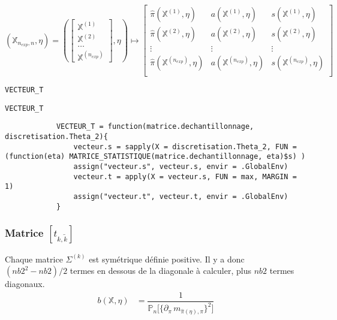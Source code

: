 \documentclass{article}
\newenvironment{fonction}[1][htb]
  {\renewcommand{\algorithmcfname}{Fonction}%
   \begin{algorithm}[#1]%
  }{\end{algorithm}}
\begin{document}
    $$
    (\mathbb{X}_{n_{exp},n}, \eta) =                         
    (\begin{bmatrix}
        \mathbb{X}^{(1)} \\
        \mathbb{X}^{(2)} \\
        \ldots \\
        \mathbb{X}^{(n_{exp})}
    \end{bmatrix},\eta) 
    \longmapsto 
    \begin{bmatrix}
        \hat\pi(\mathbb{X}^{(1)},\eta) & a(\mathbb{X}^{(1)},\eta) & s(\mathbb{X}^{(1)},\eta) \\
        \hat\pi(\mathbb{X}^{(2)},\eta) & a(\mathbb{X}^{(2)},\eta) & s(\mathbb{X}^{(2)},\eta) \\
        \vdots & \vdots & \vdots \\
        \hat\pi(\mathbb{X}^{(n_{exp})},\eta) & a(\mathbb{X}^{(n_{exp})},\eta) & s(\mathbb{X}^{(n_{exp})},\eta) \\
    \end{bmatrix}
    $$
    \clearpage
    \pagebreak
    \begin{fonction}[t]
        \caption{\texttt{VECTEUR\_T}}
    \end{fonction}
    \begin{script}[t]
        \caption{\texttt{VECTEUR\_T}}
        \begin{verbatim}
            VECTEUR_T = function(matrice.dechantillonnage, discretisation.Theta_2){
                vecteur.s = sapply(X = discretisation.Theta_2, FUN = (function(eta) MATRICE_STATISTIQUE(matrice.dechantillonnage, eta)$s) )
                assign("vecteur.s", vecteur.s, envir = .GlobalEnv)
                vecteur.t = apply(X = vecteur.s, FUN = max, MARGIN = 1)
                assign("vecteur.t", vecteur.t, envir = .GlobalEnv)
            }
        \end{verbatim}
    \end{script}

    \subsubsection{Matrice $[{t}_{k,\tilde{k}}]$}


    Chaque matrice $\Sigma^{(k)}$ est symétrique définie positive. Il y a donc $(nb2^2-nb2)/2$ termes en dessous de la diagonale à calculer, plus $nb2$ termes diagonaux. \\ 

    \begin{align*}
        b(\mathbb{X},\eta) & = \dfrac{1}{\mathbb{P}_n\big[ \{\partial_\pi\, m_{\hat\pi(\eta),\pi}\}^2 \big]}
    \end{align*}

    
        
\end{document}
